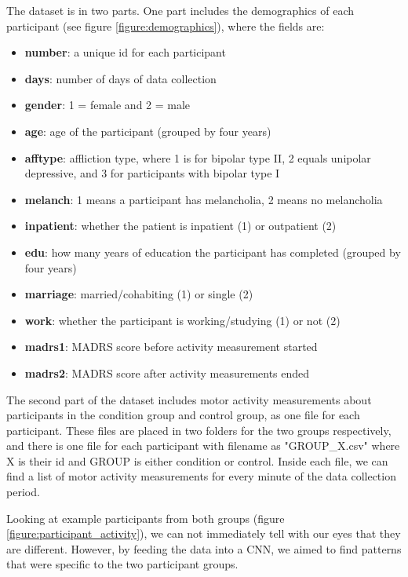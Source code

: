 The dataset is in two parts. One part includes the demographics of each participant (see figure \ref{figure:demographics}), where the fields are:

\begin{itemize}
    \item \textbf{number}: a unique id for each participant
    \item \textbf{days}: number of days of data collection 
    \item \textbf{gender}: 1 = female and 2 = male
    \item \textbf{age}: age of the participant (grouped by four years)
    \item \textbf{afftype}: affliction type, where 1 is for bipolar type II, 2 equals unipolar depressive, and 3 for participants with bipolar type I
    \item \textbf{melanch}: 1 means a participant has melancholia, 2 means no melancholia
    \item \textbf{inpatient}: whether the patient is inpatient (1) or outpatient (2)
    \item \textbf{edu}: how many years of education the participant has completed (grouped by four years)
    \item \textbf{marriage}: married/cohabiting (1) or single (2)
    \item \textbf{work}: whether the participant is working/studying (1) or not (2)
    \item \textbf{madrs1}: MADRS score before activity measurement started
    \item \textbf{madrs2}: MADRS score after activity measurements ended
\end{itemize}

The second part of the dataset includes motor activity measurements about participants in the condition group and control group, as one file for each participant. These files are placed in two folders for the two groups respectively, and there is one file for each participant with filename as "GROUP\_X.csv" where X is their id and GROUP is either condition or control. Inside each file, we can find a list of motor activity measurements for every minute of the data collection period.

Looking at example participants from both groups (figure \ref{figure:participant_activity}), we can not immediately tell with our eyes that they are different. However, by feeding the data into a CNN, we aimed to find patterns that were specific to the two participant groups. 


